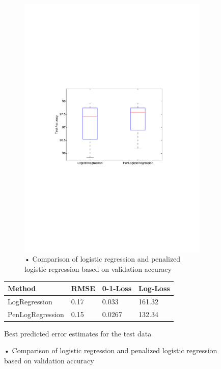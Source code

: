 \begin{figure}[h]
  \begin{minipage}[b]{0.50\linewidth}
    \centering
    \begin{subfigure}[b]{0.8\textwidth}
    \includegraphics[clip, trim=4cm 10cm 3.5cm 10cm, width=\textwidth]{figures/comparison_LR_pLR.pdf}
    \caption{• Comparison of logistic regression and penalized logistic regression based on validation accuracy}
    \label{fig:comp_LR_pLR}
  \end{subfigure}
  \end{minipage}%
  \begin{minipage}[b]{0.40\linewidth}
    \centering
    \begin{tabular}{ | l | l | l | p{1.2cm} |}
    \hline
    Method & RMSE & 0-1-Loss & Log-Loss \\ \hline
    LogRegression & 0.17 & 0.033 & 161.32 \\ \hline
    PenLogRegression & 0.15 & 0.0267 & 132.34 \\ \hline
    \end{tabular}
    \caption{Best predicted error estimates for the test data}
	\label{table:test_errors}
    \par\vspace{60pt}
  \end{minipage}
\label{fig:test}
\caption{• Comparison of logistic regression and penalized logistic regression based on validation accuracy}
\end{figure} 
 
